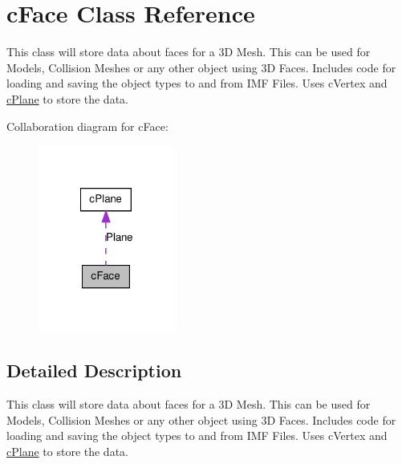 \hypertarget{classc_face}{
\section{cFace Class Reference}
\label{classc_face}
}


This class will store data about faces for a 3D Mesh. This can be used for Models, Collision Meshes or any other object using 3D Faces. Includes code for loading and saving the object types to and from IMF Files. Uses cVertex and \hyperlink{classc_plane}{cPlane} to store the data.  




Collaboration diagram for cFace:\nopagebreak
\begin{figure}[H]
\begin{center}
\leavevmode
\includegraphics[width=128pt]{classc_face__coll__graph}
\end{center}
\end{figure}


\subsection{Detailed Description}
This class will store data about faces for a 3D Mesh. This can be used for Models, Collision Meshes or any other object using 3D Faces. Includes code for loading and saving the object types to and from IMF Files. Uses cVertex and \hyperlink{classc_plane}{cPlane} to store the data. 
